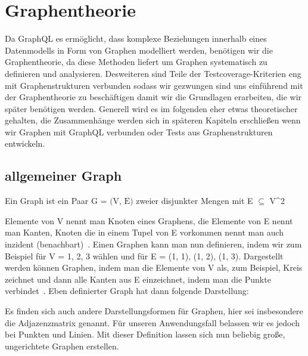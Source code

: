 \section{Graphentheorie}
\label{sec:graphentheorie}
Da GraphQL es ermöglicht, dass komplexe Beziehungen innerhalb eines Datenmodells in Form von Graphen modelliert werden, benötigen
wir die Graphentheorie, da diese Methoden liefert um Graphen systematisch zu definieren und analysieren.
Desweiteren sind Teile der Testcoverage-Kriterien eng mit Graphenstrukturen verbunden sodass wir gezwungen sind uns
einführend mit der Graphentheorie zu beschäftigen damit wir die Grundlagen erarbeiten, die wir später benötigen werden.
Generell wird es im folgenden eher etwas theoretischer gehalten, die Zusammenhänge werden sich in späteren Kapiteln
erschließen wenn wir Graphen mit GraphQL verbunden oder Tests aus Graphenstrukturen entwickeln.

\subsection{allgemeiner Graph}

Ein Graph ist ein Paar $\textrm{G = (V, E)}$ zweier disjunkter Mengen mit E $\subseteq$ V^2~\cite[vgl. S.2 0.1 Graphen]{graphentheorie}

Elemente von V nennt man Knoten eines Graphens, die Elemente von E nennt man Kanten, Knoten die in einem Tupel von E vorkommen
nennt man auch inzident (benachbart)~\cite[vgl. S.3 0.1 Graphen]{graphentheorie}.
Einen Graphen kann man nun definieren, indem wir zum Beispiel für V = {1, 2, 3} wählen und für E = {(1, 1), (1, 2), (1, 3)}.
Dargestellt werden können Graphen, indem man die Elemente von V als, zum Beispiel, Kreis zeichnet und dann alle Kanten aus E
einzeichnet, indem man die Punkte verbindet~\cite[vgl. S.2 0.1 Graphen]{graphentheorie}.
Eben definierter Graph hat dann folgende Darstellung:

\begin{center}
\end{center}

Es finden sich auch andere Darstellungsformen für Graphen, hier sei insbesondere die Adjazenzmatrix genannt.
Für unseren Anwendungsfall belassen wir es jedoch bei Punkten und Linien.
Mit dieser Definition lassen sich nun beliebig große, ungerichtete Graphen erstellen.

